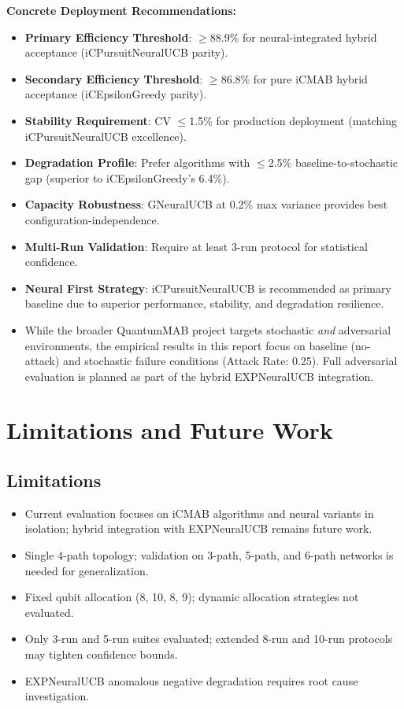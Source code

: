 \documentclass[12pt,a4paper]{article}
\begin{document}
\textbf{Concrete Deployment Recommendations:}
\begin{itemize}
\item \textbf{Primary Efficiency Threshold}: $\geq$88.9\% for neural-integrated hybrid acceptance (iCPursuitNeuralUCB parity).
\item \textbf{Secondary Efficiency Threshold}: $\geq$86.8\% for pure iCMAB hybrid acceptance (iCEpsilonGreedy parity).
\item \textbf{Stability Requirement}: CV $\leq$1.5\% for production deployment (matching iCPursuitNeuralUCB excellence).
\item \textbf{Degradation Profile}: Prefer algorithms with $\leq$2.5\% baseline-to-stochastic gap (superior to iCEpsilonGreedy's 6.4\%).
\item \textbf{Capacity Robustness}: GNeuralUCB at 0.2\% max variance provides best configuration-independence.
\item \textbf{Multi-Run Validation}: Require at least 3-run protocol for statistical confidence.
\item \textbf{Neural First Strategy}: iCPursuitNeuralUCB is recommended as primary baseline due to superior performance, stability, and degradation resilience.
\item While the broader QuantumMAB project targets stochastic \emph{and} adversarial environments, the empirical results in this report focus on baseline (no-attack) and stochastic failure conditions (Attack Rate: 0.25). Full adversarial evaluation is planned as part of the hybrid EXPNeuralUCB integration.
\end{itemize}

\section{Limitations and Future Work}

\subsection{Limitations}
\begin{itemize}
\item Current evaluation focuses on iCMAB algorithms and neural variants in isolation; hybrid integration with EXPNeuralUCB remains future work.
\item Single 4-path topology; validation on 3-path, 5-path, and 6-path networks is needed for generalization.
\item Fixed qubit allocation (8, 10, 8, 9); dynamic allocation strategies not evaluated.
\item Only 3-run and 5-run suites evaluated; extended 8-run and 10-run protocols may tighten confidence bounds.
\item EXPNeuralUCB anomalous negative degradation requires root cause investigation.
\end{itemize}
\end{document}
